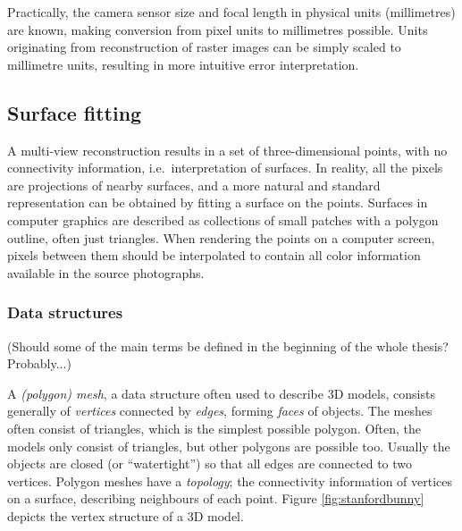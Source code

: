 
Practically, the camera sensor size and focal length in physical units (millimetres) are known, making conversion from pixel units to millimetres possible.
Units originating from reconstruction of raster images can be simply scaled to millimetre units, resulting in more intuitive error interpretation.




\subsection{Surface fitting} %

A multi-view reconstruction results in a set of three-dimensional points, with no connectivity information, i.e.\ interpretation of surfaces.
In reality, all the pixels are projections of nearby surfaces, and a more natural and standard representation can be obtained by fitting a surface on the points.
Surfaces in computer graphics are described as collections of small patches with a polygon outline, often just triangles.
When rendering the points on a computer screen, pixels between them should be interpolated to contain all color information available in the source photographs.

\subsubsection{Data structures} %



(Should some of the main terms be defined in the beginning of the whole thesis? Probably...)

A \emph{(polygon) mesh}, a data structure often used to describe 3D models, consists generally of \emph{vertices} connected by \emph{edges}, forming \emph{faces} of objects.
The meshes often consist of triangles, which is the simplest possible polygon.
Often, the models only consist of triangles, but other polygons are possible too.
Usually the objects are closed (or ``watertight'') so that all edges are connected to two vertices.
Polygon meshes have a \emph{topology}; the connectivity information of vertices on a surface, describing neighbours of each point.
Figure \ref{fig:stanfordbunny} depicts the vertex structure of a 3D model.

